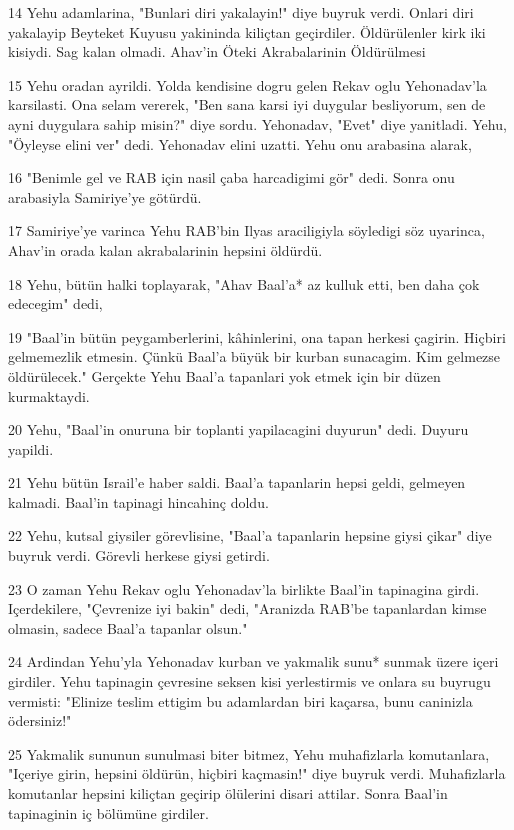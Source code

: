 \par 14 Yehu adamlarina, "Bunlari diri yakalayin!" diye buyruk verdi. Onlari diri yakalayip Beyteket Kuyusu yakininda kiliçtan geçirdiler. Öldürülenler kirk iki kisiydi. Sag kalan olmadi. Ahav'in Öteki Akrabalarinin Öldürülmesi
\par 15 Yehu oradan ayrildi. Yolda kendisine dogru gelen Rekav oglu Yehonadav'la karsilasti. Ona selam vererek, "Ben sana karsi iyi duygular besliyorum, sen de ayni duygulara sahip misin?" diye sordu. Yehonadav, "Evet" diye yanitladi. Yehu, "Öyleyse elini ver" dedi. Yehonadav elini uzatti. Yehu onu arabasina alarak,
\par 16 "Benimle gel ve RAB için nasil çaba harcadigimi gör" dedi. Sonra onu arabasiyla Samiriye'ye götürdü.
\par 17 Samiriye'ye varinca Yehu RAB'bin Ilyas araciligiyla söyledigi söz uyarinca, Ahav'in orada kalan akrabalarinin hepsini öldürdü.
\par 18 Yehu, bütün halki toplayarak, "Ahav Baal'a* az kulluk etti, ben daha çok edecegim" dedi,
\par 19 "Baal'in bütün peygamberlerini, kâhinlerini, ona tapan herkesi çagirin. Hiçbiri gelmemezlik etmesin. Çünkü Baal'a büyük bir kurban sunacagim. Kim gelmezse öldürülecek." Gerçekte Yehu Baal'a tapanlari yok etmek için bir düzen kurmaktaydi.
\par 20 Yehu, "Baal'in onuruna bir toplanti yapilacagini duyurun" dedi. Duyuru yapildi.
\par 21 Yehu bütün Israil'e haber saldi. Baal'a tapanlarin hepsi geldi, gelmeyen kalmadi. Baal'in tapinagi hincahinç doldu.
\par 22 Yehu, kutsal giysiler görevlisine, "Baal'a tapanlarin hepsine giysi çikar" diye buyruk verdi. Görevli herkese giysi getirdi.
\par 23 O zaman Yehu Rekav oglu Yehonadav'la birlikte Baal'in tapinagina girdi. Içerdekilere, "Çevrenize iyi bakin" dedi, "Aranizda RAB'be tapanlardan kimse olmasin, sadece Baal'a tapanlar olsun."
\par 24 Ardindan Yehu'yla Yehonadav kurban ve yakmalik sunu* sunmak üzere içeri girdiler. Yehu tapinagin çevresine seksen kisi yerlestirmis ve onlara su buyrugu vermisti: "Elinize teslim ettigim bu adamlardan biri kaçarsa, bunu caninizla ödersiniz!"
\par 25 Yakmalik sununun sunulmasi biter bitmez, Yehu muhafizlarla komutanlara, "Içeriye girin, hepsini öldürün, hiçbiri kaçmasin!" diye buyruk verdi. Muhafizlarla komutanlar hepsini kiliçtan geçirip ölülerini disari attilar. Sonra Baal'in tapinaginin iç bölümüne girdiler.
